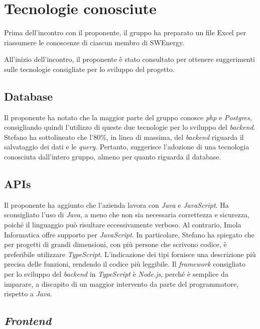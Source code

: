 \section{Tecnologie conosciute}

Prima dell'incontro con il proponente, il gruppo ha preparato un file Excel
per riassumere le conoscenze di ciascun membro di SWEnergy.

All'inizio dell'incontro, il proponente è stato consultato per ottenere
suggerimenti sulle tecnologie consigliate per lo sviluppo del progetto.

\subsection{Database}

Il proponente ha notato che la maggior parte del gruppo conosce \textit{php} e
\textit{Postgres}, consigliando quindi l'utilizzo di queste due tecnologie per
lo sviluppo del \textit{backend}. Stefano ha sottolineato che l'80\%, in linea di
massima, del \textit{backend} riguarda il salvataggio dei dati e le \textit{query}. Pertanto,
suggerisce l'adozione di una tecnologia conosciuta dall'intero gruppo, almeno
per quanto riguarda il database.

\subsection{APIs}

Il proponente ha aggiunto che l'azienda lavora con \textit{Java} e
\textit{JavaScript}. Ha sconsigliato l'uso di \textit{Java}, a meno che non sia
necessaria correttezza e sicurezza, poiché il linguaggio può risultare
eccessivamente verboso. Al contrario, Imola Informatica offre supporto per
\textit{JavaScript}. In particolare, Stefano ha spiegato che per progetti di
grandi dimensioni, con più persone che scrivono codice, è preferibile
utilizzare \textit{TypeScript}. L'indicazione dei tipi fornisce una
descrizione più precisa delle funzioni, rendendo il codice più leggibile. Il
\textit{framework} consigliato per lo sviluppo del \textit{backend} in
\textit{TypeScript} è \textit{Node.js}, perché è semplice da imparare, a
discapito di un maggior intervento da parte del programmatore,
rispetto a \textit{Java}.

\subsection{\textit{Frontend}}

